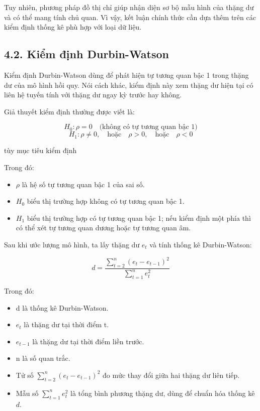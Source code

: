 \documentclass[12pt,a4paper]{article}
\begin{document}
Tuy nhiên, phương pháp đồ thị chỉ giúp nhận diện sơ bộ mẫu hình của thặng dư và có thể mang tính chủ quan. Vì vậy, kết luận chính thức cần dựa thêm trên các kiểm định thống kê phù hợp với loại dữ liệu.


\subsection{4.2. Kiểm định
Durbin-Watson}\label{kiux1ec3m-ux111ux1ecbnh-durbin-watson}

Kiểm định Durbin-Watson dùng để phát hiện tự tương quan bậc 1 trong
thặng dư của mô hình hồi quy. Nói cách khác, kiểm định này xem thặng dư
hiện tại có liên hệ tuyến tính với thặng dư ngay kỳ trước hay không.

Giả thuyết kiểm định thường được viết là:

\[
H_0:\rho=0 \quad \text{(không có tự tương quan bậc 1)}
\]
\[
H_1:\rho\neq 0,\quad \text{hoặc}\quad \rho>0,\quad \text{hoặc}\quad \rho<0
\]

tùy mục tiêu kiểm định

Trong đó:

\begin{itemize}
\item
  \(\rho\) là hệ số tự tương quan bậc 1 của sai số.
\item
  \(H_0\) biểu thị trường hợp không có tự tương quan bậc 1.
\item
  \(H_1\) biểu thị trường hợp có tự tương quan bậc 1; nếu kiểm định một phía
  thì có thể xét tự tương quan dương hoặc tự tương quan âm.
\end{itemize}

Sau khi ước lượng mô hình, ta lấy thặng dư \(e_t\) và tính thống kê
Durbin-Watson:

\[
d=\frac{\sum_{t=2}^{n}(e_t-e_{t-1})^2}{\sum_{t=1}^{n}e_t^2}
\]

Trong đó:

\begin{itemize}
\item
  d là thống kê Durbin-Watson.
\item
  \(e_t\) là thặng dư tại thời điểm t.
\item
  \(e_{t-1}\) là thặng dư tại thời điểm liền trước.
\item
  n là số quan trắc.
\item Tử số 
    $\sum_{t=2}^{n}(e_t - e_{t-1})^2$
    đo mức thay đổi giữa hai thặng dư liên tiếp.

\item Mẫu số 
    $\sum_{t=1}^{n} e_t^2$
    là tổng bình phương thặng dư, dùng để chuẩn hóa thống kê $d$.
\end{itemize}
\end{document}
